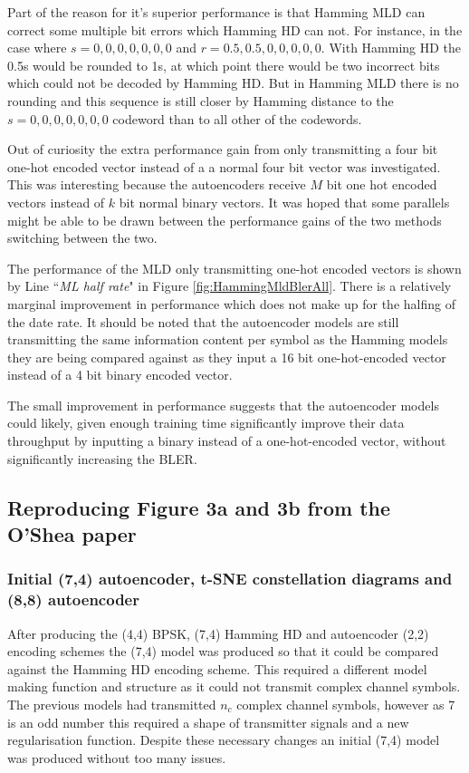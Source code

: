 \documentclass[12pt,onecolumn,letterpaper]{article}
\begin{document}
Part of the reason for it's superior performance is that Hamming MLD can correct some multiple bit errors which Hamming HD can not. For instance, in the case where $s = 0,0,0,0,0,0,0$ and $r = 0.5,0.5,0,0,0,0,0$. With Hamming HD the 0.5s would be rounded to 1s, at which point there would be two incorrect bits which could not be decoded by Hamming HD. But in Hamming MLD there is no rounding and this sequence is still closer by Hamming distance to the $s = 0,0,0,0,0,0,0$ codeword than to all other of the codewords.

Out of curiosity the extra performance gain from only transmitting a four bit one-hot encoded vector instead of a a normal four bit vector was investigated. This was interesting because the autoencoders receive $M$ bit one hot encoded vectors instead of $k$ bit normal binary vectors. It was hoped that some parallels might be able to be drawn between the performance gains of the two methods switching between the two. 

The performance of the MLD only transmitting one-hot encoded vectors is shown by Line ``\textit{ML half rate}" in Figure \ref{fig:HammingMldBlerAll}. There is a relatively marginal improvement in performance which does not make up for the halfing of the date rate. It should be noted that the autoencoder models are still transmitting the same information content per symbol as the Hamming models they are being compared against as they input a 16 bit one-hot-encoded vector instead of a 4 bit binary encoded vector.

The small improvement in performance suggests that the autoencoder models could likely, given enough training time significantly improve their data throughput by inputting a binary instead of a one-hot-encoded vector, without significantly increasing the BLER.

\subsection{Reproducing Figure 3a and 3b from the O'Shea paper}

\subsubsection{Initial (7,4) autoencoder, t-SNE constellation diagrams and (8,8) autoencoder}

After producing the (4,4) BPSK, (7,4) Hamming HD and autoencoder (2,2) encoding schemes the (7,4) model was produced so that it could be compared against the Hamming HD encoding scheme. This required a different model making function and structure as it could not transmit complex channel symbols. The previous models had transmitted $n_c$ complex channel symbols, however as 7 is an odd number this required a shape of transmitter signals and a new regularisation function. Despite these necessary changes an initial (7,4) model was produced without too many issues. 
\end{document}
